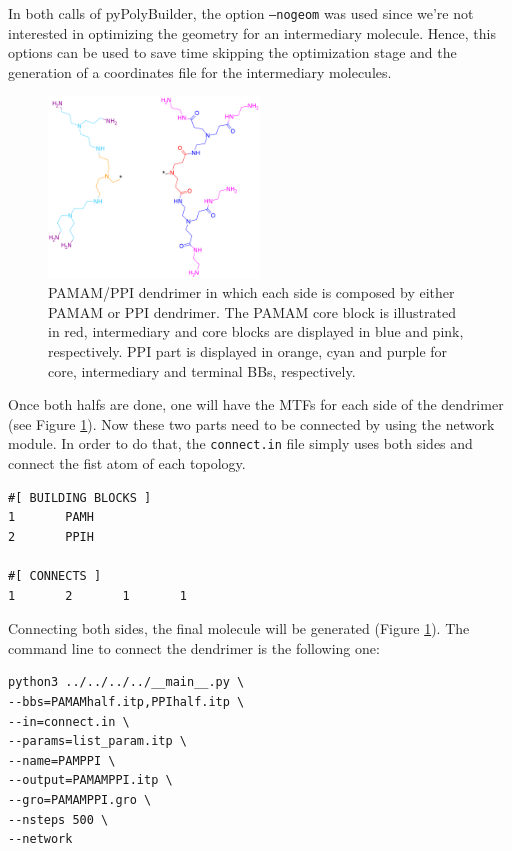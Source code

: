 In both calls of pyPolyBuilder, the option \texttt{--nogeom} was used since we're not interested in optimizing the geometry for an intermediary molecule. 
Hence, this options can be used to save time skipping the optimization stage and the generation of a coordinates file for the intermediary molecules.

\begin{figure}
    \centering
    \includegraphics[width=0.5\textwidth]{PAMAM_PPI-half/PAMAMPPIHalfs.png}
    \caption{PAMAM/PPI dendrimer in which each side is composed by either PAMAM or PPI dendrimer. The PAMAM core block is illustrated in red, intermediary and core blocks are displayed in blue and pink, respectively. PPI part is displayed in orange, cyan and purple for core, intermediary and terminal BBs, respectively. }
    \label{fig:HalfHalf}
\end{figure}

Once both halfs are done, one will have the MTFs for each side of the dendrimer (see Figure \ref{fig:HalfHalf}).
Now these two parts need to be connected by using the network module.
In order to do that, the \texttt{connect.in} file simply uses both sides and connect the fist atom of each topology.

\begin{lstlisting}
#[ BUILDING BLOCKS ]
1       PAMH
2       PPIH

#[ CONNECTS ]
1       2       1       1
\end{lstlisting}

Connecting both sides, the final molecule will be generated (Figure \ref{fig:HalfHalf}).
The command line to connect the dendrimer is the following one:

\begin{lstlisting}
python3 ../../../../__main__.py \
--bbs=PAMAMhalf.itp,PPIhalf.itp \
--in=connect.in \
--params=list_param.itp \
--name=PAMPPI \
--output=PAMAMPPI.itp \
--gro=PAMAMPPI.gro \
--nsteps 500 \
--network
\end{lstlisting}

